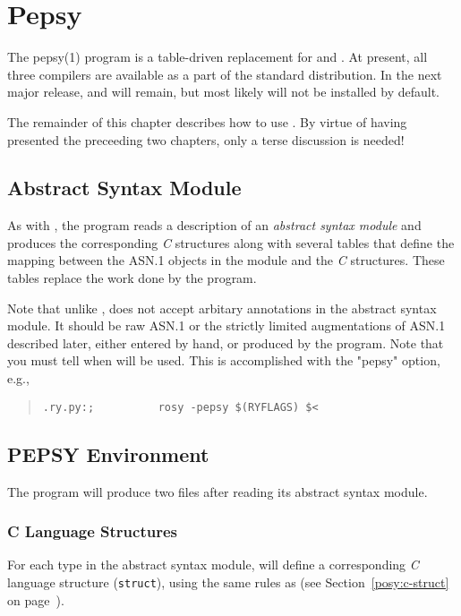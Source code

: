 
\chapter	{Pepsy}\label{pepsy}
The \man pepsy(1) program is a table-driven replacement for  and
.
At present,
all three compilers are available as a part of the standard distribution.
In the next major release,
 and  will remain,
but most likely will not be installed by default.

The remainder of this chapter describes how to use .
By virtue of having presented the preceeding two chapters,
only a terse discussion is needed!

\section	{Abstract Syntax Module}
As with ,
the  program reads a description of an {\em abstract syntax
module\/}
and produces the corresponding {\em C\/} structures along with several tables
that define the mapping between the ASN.1 objects in the module and the
{\em C\/} structures.
These tables replace the work done by the  program.

Note that unlike ,
 does not accept arbitary annotations in the abstract syntax module.
It should be raw ASN.1
or the strictly limited augmentations of ASN.1 described later,
either entered by hand,
or produced by the  program.
Note that you must tell  when  will be used.
This is accomplished with the \switch"pepsy" option,
e.g.,
\begin{quote}\small\begin{verbatim}
.ry.py:;          rosy -pepsy $(RYFLAGS) $<
\end{verbatim}\end{quote}

\section	{PEPSY Environment}
The  program will produce two files after reading its abstract
syntax module.

\subsection	{C Language Structures}
For each type in the abstract syntax module,
 will define a corresponding {\em C\/} language structure
(\verb"struct"),
using the same rules as 
(see Section~\ref{posy:c-struct} on page~\pageref{posy:c-struct}).

